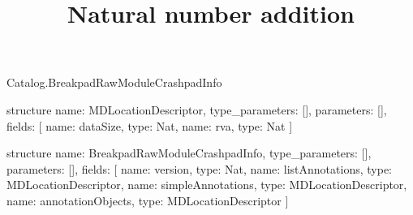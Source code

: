 \begin{lexlean}{Catalog.BreakpadRawModuleCrashpadInfo}
\title{Natural number addition}
\begin{semanticmodule}
structure{
  name: MDLocationDescriptor,
  type_parameters: [],
  parameters: [],
  fields: [
    {name: dataSize, type: Nat},
    {name: rva, type: Nat}
  ]
}

structure{
  name: BreakpadRawModuleCrashpadInfo,
  type_parameters: [],
  parameters: [],
  fields: [
    {name: version, type: Nat},
    {name: listAnnotations, type: MDLocationDescriptor},
    {name: simpleAnnotations, type: MDLocationDescriptor},
    {name: annotationObjects, type: MDLocationDescriptor}
  ]
}
\end{semanticmodule}
\end{lexlean}
